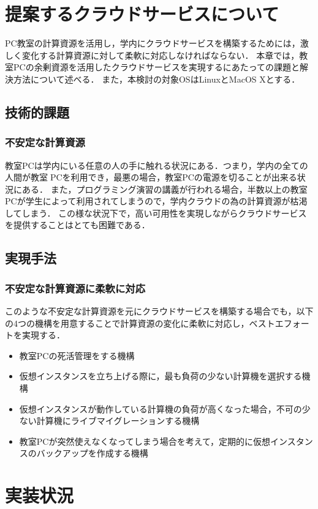 \section{提案するクラウドサービスについて}
PC教室の計算資源を活用し，学内にクラウドサービスを構築するためには，激しく変化する計算資源に対して柔軟に対応しなければならない．
本章では，教室PCの余剰資源を活用したクラウドサービスを実現するにあたっての課題と解決方法について述べる．
また，本検討の対象OSはLinuxとMacOS Xとする．
\subsection{技術的課題}
\subsubsection{不安定な計算資源}
教室PCは学内にいる任意の人の手に触れる状況にある．つまり，学内の全ての人間が教室PCを利用でき，最悪の場合，教室PCの電源を切ることが出来る状況にある．
また，プログラミング演習の講義が行われる場合，半数以上の教室PCが学生によって利用されてしまうので，学内クラウドの為の計算資源が枯渇してしまう．
この様な状況下で，高い可用性を実現しながらクラウドサービスを提供することはとても困難である．
\subsection{実現手法}
\subsubsection{不安定な計算資源に柔軟に対応}
このような不安定な計算資源を元にクラウドサービスを構築する場合でも，以下の4つの機構を用意することで計算資源の変化に柔軟に対応し，ベストエフォートを実現する．
\begin{itemize}
	\item 教室PCの死活管理をする機構
	\item 仮想インスタンスを立ち上げる際に，最も負荷の少ない計算機を選択する機構
	\item 仮想インスタンスが動作している計算機の負荷が高くなった場合，不可の少ない計算機にライブマイグレーションする機構
	\item 教室PCが突然使えなくなってしまう場合を考えて，定期的に仮想インスタンスのバックアップを作成する機構
\end{itemize}

\section{実装状況}
